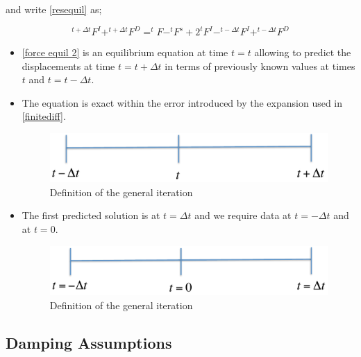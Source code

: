 and write \eqref{resequil} as;

\begin{equation}
^{t+\Delta t}F^I+^{t+\Delta t}F^D=^{t}F-^{t}F^s+2 ^{t}F^I-^{t-\Delta t}F^I+^{t-\Delta t}F^D
\label{force equil 2}
\end{equation}

\begin{itemize}
\item \eqref{force equil 2} is an equilibrium equation at time $t=t$ allowing to predict the displacements at time $t=t+\Delta t$ in terms of previously known values at times $t$ and $t=t-\Delta t$.

\item The equation is exact within the error introduced by the expansion used in \eqref{finitediff}.

\begin{figure}[h]
\centering
\includegraphics[width=12cm]{img/figure7_0.pdf}
\caption{Definition of the general iteration}
\label{fig:time iteration}
\end{figure}

\item The first predicted solution is at $t=\Delta t$ and we require data at $t=-\Delta t$ and at $t=0$.

\begin{figure}[h]
\centering
\includegraphics[width=12cm]{img/figure7_1.pdf}
\caption{Definition of the general iteration}
\label{fig:initial time iteration}
\end{figure}

\end{itemize}

\subsection{Damping Assumptions}


